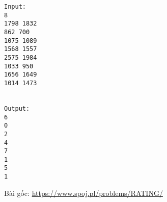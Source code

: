 \begin{verbatim}
Input:
8
1798 1832
862 700
1075 1089
1568 1557
2575 1984
1033 950
1656 1649
1014 1473


Output:
6
0
2
4
7
1
5
1

\end{verbatim}

   Bài gốc:   \href{https://www.spoj.pl/problems/RATING/}{    https://www.spoj.pl/problems/RATING/   }